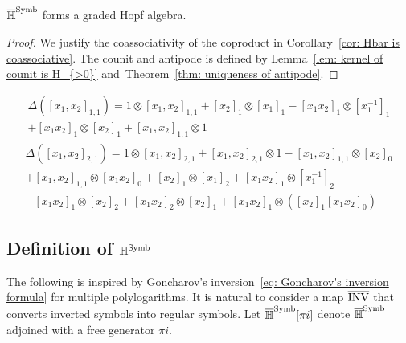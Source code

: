 \begin{theorem}\label{thm: Hbar is a Hopf algebra}
$\overline{\mathbb H}^{\operatorname{Symb}}$ forms a graded Hopf algebra.
\end{theorem}

\begin{proof}
We justify the coassociativity of the coproduct in Corollary~\ref{cor: Hbar is coassociative}. The counit and antipode is defined by Lemma~\ref{lem: kernel of counit is H_{>0}} and~Theorem~\ref{thm: uniqueness of antipode}.
\end{proof}

\begin{example}
\begin{multline}
\Delta([x_1,x_2]_{1,1})=1\otimes[x_1,x_2]_{1,1}+[x_2]_1\otimes[x_1]_1-[x_1x_2]_1\otimes[x_1^{-1}]_1\\
+[x_1x_2]_1\otimes[x_2]_1+[x_1,x_2]_{1,1}\otimes1
\end{multline}
\begin{multline}
\Delta([x_1,x_2]_{2,1})=1\otimes [x_1,x_2]_{2,1}+[x_1,x_2]_{2,1}\otimes 1-[x_1,x_2]_{1,1}\otimes [x_2]_0\\
+[x_1,x_2]_{1,1}\otimes[x_1 x_2]_0+[x_2]_1\otimes[x_1]_2+[x_1x_2]_1\otimes [x_1^{-1}]_2\\
-[x_1x_2]_1\otimes[x_2]_2+[x_1x_2]_2\otimes [x_2]_1+[x_1x_2]_1\otimes\left([x_2]_1[x_1 x_2]_0\right)
\end{multline}
\end{example}

\subsection{Definition of $\mathbb H^{\operatorname{Symb}}$}

The following is inspired by Goncharov's inversion~\eqref{eq: Goncharov's inversion formula} for multiple polylogarithms. It is natural to consider a map $\overline{\operatorname{INV}}$ that converts inverted symbols into regular symbols. Let $\overline{\mathbb H}^{\operatorname{Symb}}[\pi i]$ denote $\overline{\mathbb H}^{\operatorname{Symb}}$ adjoined with a free generator $\pi i$.

